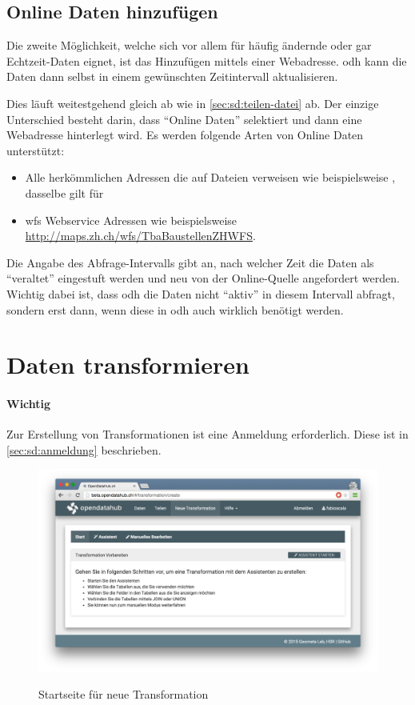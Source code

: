 \subsection{Online Daten hinzufügen}

Die zweite Möglichkeit, welche sich vor allem für häufig ändernde oder gar Echtzeit-Daten eignet, ist das Hinzufügen mittels einer Webadresse. \acl{odh} kann die Daten dann selbst in einem gewünschten Zeitintervall aktualisieren.

Dies läuft weitestgehend gleich ab wie in \cref{sec:sd:teilen-datei} ab. Der einzige Unterschied besteht darin, dass ``Online Daten'' selektiert und dann eine Webadresse hinterlegt wird. Es werden folgende Arten von Online Daten unterstützt:

\begin{itemize}
\item Alle herkömmlichen Adressen die auf Dateien verweisen wie beispielsweise , dasselbe gilt für 
\item \gls{wfs} Webservice Adressen wie beispielsweise \url{http://maps.zh.ch/wfs/TbaBaustellenZHWFS}.
\end{itemize}

Die Angabe des Abfrage-Intervalls gibt an, nach welcher Zeit die Daten als ``veraltet'' eingestuft werden und neu von der Online-Quelle angefordert werden. Wichtig dabei ist, dass \acl{odh} die Daten nicht ``aktiv'' in diesem Intervall abfragt, sondern erst dann, wenn diese in \acl{odh} auch wirklich benötigt werden.

\section{Daten transformieren}
\paragraph{Wichtig} Zur Erstellung von Transformationen ist eine Anmeldung erforderlich. Diese ist in \vref{sec:sd:anmeldung} beschrieben.

\begin{figure}[H]
	\centering
	\includegraphics[width=\linewidth]{fig/screenshot-neue-transformation}
	\label{fig:sd:screenshot-neue-transformation}
	\caption{Startseite für neue Transformation}
\end{figure}

